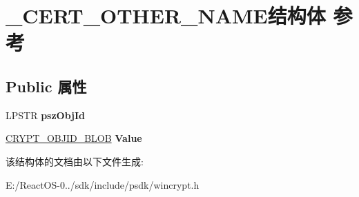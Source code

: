 \hypertarget{struct___c_e_r_t___o_t_h_e_r___n_a_m_e}{}\section{\+\_\+\+C\+E\+R\+T\+\_\+\+O\+T\+H\+E\+R\+\_\+\+N\+A\+M\+E结构体 参考}
\label{struct___c_e_r_t___o_t_h_e_r___n_a_m_e}
\subsection*{Public 属性}
\begin{DoxyCompactItemize}
\item 
\mbox{\label{struct___c_e_r_t___o_t_h_e_r___n_a_m_e_afe44236dc5f8dd097e0fc8a1ef4764e3}} 
L\+P\+S\+TR {\bfseries psz\+Obj\+Id}
\item 
\mbox{\label{struct___c_e_r_t___o_t_h_e_r___n_a_m_e_a6df58f2f7b031791be8630dbf20ea89e}} 
\hyperlink{struct___c_r_y_p_t_o_a_p_i___b_l_o_b}{C\+R\+Y\+P\+T\+\_\+\+O\+B\+J\+I\+D\+\_\+\+B\+L\+OB} {\bfseries Value}
\end{DoxyCompactItemize}


该结构体的文档由以下文件生成\+:\begin{DoxyCompactItemize}
\item 
E\+:/\+React\+O\+S-\/0../sdk/include/psdk/wincrypt.\+h\end{DoxyCompactItemize}
